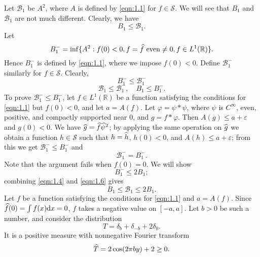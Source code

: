Let $\mathcal{B}_{1}$ be $A^{2}$, where $A$ is defined by \eqref{eqn:1.1} for $f \in \mathcal{S}$.
We will see that $B_{1}$ and $\mathcal{B}_{1}$ are not much different.
Clearly, we have
\begin{equation}
    \label{eqn:1.2}
    B_{1} \leq \mathcal{B}_{1}.
\end{equation}
Let
\[
    B_{1}^{-} = \inf \{A^{2}: f(0) < 0, f = \widehat{f}\text{ even} \neq 0, f \in L^{1}(\mathbb{R})\}.
\]
Hence $B_{1}^{-}$ is defined by \eqref{eqn:1.1}, where we impose $f(0) < 0$.
Define $\mathcal{B}_{1}^{-}$ similarly for $f \in \mathcal{S}$.
Clearly,
\begin{equation}
    \label{eqn:1.3}
    B_{1}^{-} \leq \mathcal{B}_{1}^{-}
\end{equation}
\begin{equation}
    \label{eqn:1.4}
    \mathcal{B}_{1} \leq \mathcal{B}_{1}^{-}, \quad B_{1} \leq B_{1}^{-}.
\end{equation}
To prove $\mathcal{B}_{1}^{-} \leq B_{1}^{-}$, let $f \in L^{1}(\mathbb{R})$ be a function satisfying the conditions for \eqref{eqn:1.1} but $f(0) < 0$, and let $a = A(f)$.
Let $\varphi = \psi \ast \psi$, where $\psi$ is $C^{\infty}$, even, positive, and compactly supported near $0$, and $g = f \ast \varphi$.
Then $A(g) \leq a + \varepsilon$ and $g(0) < 0$.
We have $\widehat{g} = \widehat{f} \widehat{\psi}^{2}$; by applying the same operation on $\widehat{g}$ we obtain a function $h \in \mathcal{S}$ such that $h = \widehat{h}$, $h(0) < 0$, and $A(h) \leq a + \varepsilon$; from this we get $\mathcal{B}_{1}^{-} \leq B_{1}^{-}$ and
\begin{equation}
    \label{eqn:1.5}
    \mathcal{B}_{1}^{-} = B_{1}^{-}.
\end{equation}
Note that the argument fails when $f(0) = 0$.
We will show
\begin{equation}
    \label{eqn:1.6}
    B_{1}^{-} \leq 2B_{1};
\end{equation}
combining \eqref{eqn:1.4} and \eqref{eqn:1.6} gives
\begin{equation}
    \label{eqn:1.7}
    B_{1} \leq \mathcal{B}_{1} \leq 2 B_{1}.
\end{equation}
Let $f$ be a function satisfying the conditions for \eqref{eqn:1.1} and $a = A(f)$.
Since $\widehat{f}(0) = \int f(x) \mathrm{d} x = 0$, $f$ takes a negative value on $[-a, a]$.
Let $b > 0$ be such a number, and consider the distribution
\[
    T = \delta_{b} + \delta_{-b} + 2 \delta_{0}.
\]
It is a positive measure with nonnegative Fourier transform
\[
    \widehat{T} = 2 \cos (2 \pi b y) + 2 \geq 0.
\]
